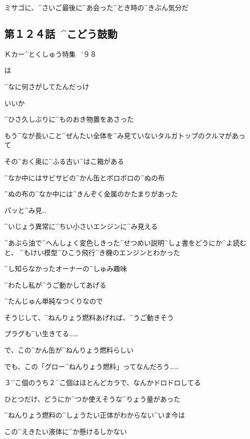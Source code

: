 \Ayase ミサゴに、^{さいご}{最後}に^{あ}{会}った^{とき}{時}の^{きぶん}{気分}だ


\subsection{第１２４話\ ^{こどう}{鼓動}}

\page[52]
\Sign Ｋカー^{とくしゅう}{特集}
\ ’９８

\Alpha は

\Alpha ^{なに}{何}さがしてたんだっけ

\page
\Alpha いいか

\Alpha ^{ひさ}{久}しぶりに^{ものおき}{物置}をあさった

\Alpha もう^{なが}{長}いこと^{ぜんたい}{全体}を^{み}{見}ていないタルガトップのクルマがあって

\Alpha その^{おく}{奥}に^{ふる}{古}い^{はこ}{箱}がある

\page
\Alpha ^{なか}{中}にはサビサビの^{かん}{缶}とボロボロの^{ぬの}{布}

\Alpha ^{ぬの}{布}の^{なか}{中}には^{きんぞく}{金属}のかたまりがあった

\Alpha パッと^{み}{見}…

\Alpha ^{いじょう}{異常}に^{ちい}{小}さいエンジンに^{み}{見}える

\page
\Alpha ^{あぶら}{油}で^{へんしょく}{変色}しきった^{せつめい}{説明}^{しょ}{書}をどうにか^{よ}{読}むと、
^{もけい}{模型}^{ひこう}{飛行}^{き}{機}のエンジンとわかった

\Alpha ^{し}{知}らなかったオーナーの^{しゅみ}{趣味}

\Alpha ^{わたし}{私}が^{うご}{動}かしてあげる

\page
\Alpha ^{たんじゅん}{単純}なつくりなので

\Alpha そうじして、^{ねんりょう}{燃料}あげれば、^{うご}{動}きそう

\Alpha プラグも^{い}{生}きてる……

\Alpha で、この^{かん}{缶}が^{ねんりょう}{燃料}らしい

\Alpha でも、この「グロー^{ねんりょう}{燃料}」ってなんだろう……

\Alpha ３^{こ}{個}のうち２^{こ}{個}はほとんどカラで、なんかドロドロしてる

\Alpha ひとつだけ、どうにか^{つか}{使}えそうな^{りょう}{量}があった

\Alpha ^{ねんりょう}{燃料}の^{しょうたい}{正体}がわからない^{いま}{今}は

\Alpha この^{えきたい}{液体}に^{か}{懸}けるしかない

